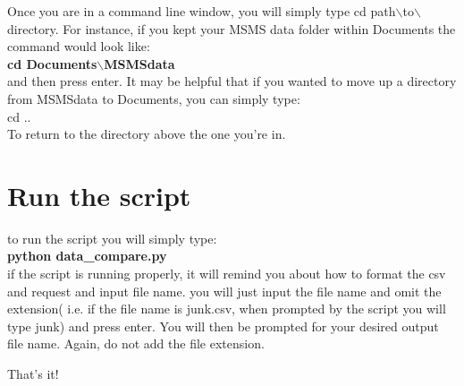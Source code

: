 \documentclass[12pt]{article}
\begin{document}
\noindent Once you are in a command line window, you will simply type cd path$\backslash$to$\backslash$directory.
For instance, if you kept your MSMS data folder within Documents the command would look like:\\

\noindent \textbf{cd Documents$\backslash$MSMSdata}\\

\noindent and then press enter. It may be helpful that if you wanted to move up a directory from MSMSdata to Documents, you can simply type:\\
cd ..\\
To return to the directory above the one you're in. 
\section{Run the script}
to run the script you will simply type:\\

\noindent \textbf{python data\_compare.py}\\

\noindent if the script is running properly, it will remind you about how to format the csv and request and input file name. you will just input the file name and omit the extension( i.e. if the file name is junk.csv, when prompted by the script you will type junk) and press enter. You will then be prompted for your desired output file name. Again, do not add the file extension.

\noindent That's it!
\end{document}
